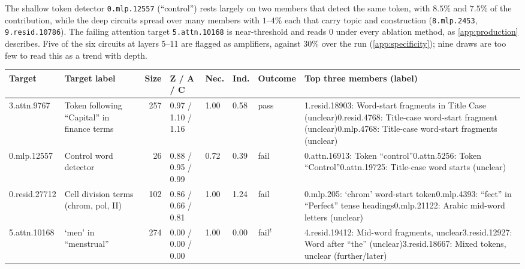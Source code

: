 \documentclass[10pt]{article}
\begin{document}
The shallow token detector \texttt{0.mlp.12557} (``control'') rests largely on two members that detect the same token, with $8.5\%$ and $7.5\%$ of the contribution, while the deep circuits spread over many members with $1$--$4\%$ each that carry topic and construction (\texttt{8.mlp.2453}, \texttt{9.resid.10786}).
The failing attention target \texttt{5.attn.10168} is near-threshold and reads $0$ under every ablation method, as \cref{app:production} describes.
Five of the six circuits at layers 5--11 are flagged as amplifiers, against $30\%$ over the run (\cref{app:specificity}); nine draws are too few to read this as a trend with depth.

\begin{table}[h]
\centering
\scriptsize
\setlength{\tabcolsep}{3pt}
\renewcommand{\arraystretch}{1.15}
\begin{tabularx}{\linewidth}{@{}l>{\raggedright\arraybackslash}p{2.3cm}rllll>{\raggedright\arraybackslash}X@{}}
\toprule
\textbf{Target} & \textbf{Target label} & \textbf{Size} & \textbf{Z / A / C} & \textbf{Nec.} & \textbf{Ind.} & \textbf{Outcome} & \textbf{Top three members (label)} \\
\midrule
3.attn.9767 & Token following ``Capital'' in finance terms & 257 & 0.97 / 1.10 / 1.16 & 1.00 & 0.58 & pass & 1.resid.18903: Word-start fragments in Title Case (unclear)\newline 0.resid.4768: Title-case word-start fragment (unclear)\newline 0.mlp.4768: Title-case word-start fragments (unclear) \\
0.mlp.12557 & Control word detector & 26 & 0.88 / 0.95 / 0.99 & 0.72 & 0.39 & fail & 0.attn.16913: Token ``control''\newline 0.attn.5256: Token ``Control''\newline 0.attn.19725: Title-case word starts (unclear) \\
0.resid.27712 & Cell division terms (chrom, pol, II) & 102 & 0.86 / 0.66 / 0.81 & 1.00 & 1.24 & fail & 0.mlp.205: `chrom' word-start token\newline 0.mlp.4393: ``fect'' in ``Perfect'' tense headings\newline 0.mlp.21122: Arabic mid-word letters (unclear) \\
\midrule
5.attn.10168 & `men' in ``menstrual'' & 274 & 0.00 / 0.00 / 0.00 & 1.00 & 0.00 & fail$^{t}$ & 4.resid.19412: Mid-word fragments, unclear\newline 3.resid.12927: Word after ``the'' (unclear)\newline 3.resid.18667: Mixed tokens, unclear (further/later) \\

\end{tabularx}
\end{table}
\end{document}
